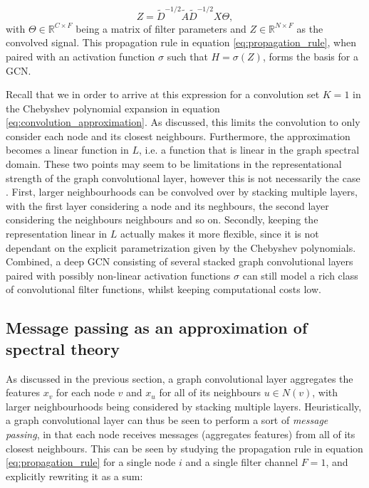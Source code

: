 \begin{equation}
    Z = \tilde{D}^{-1/2} \tilde{A} \tilde{D}^{-1/2} X \Theta,
    \label{eq:propagation_rule}
\end{equation}
with $\Theta \in \mathbb{R}^{C\times F}$ being a matrix of filter parameters and $Z \in \mathbb{R}^{N\times F}$ as the convolved signal. This propagation rule in equation \eqref{eq:propagation_rule}, when paired with an activation function $\sigma$ such that $H = \sigma\left(Z \right)$, forms the basis for a GCN. 

Recall that we in order to arrive at this expression for a convolution set $K=1$ in the Chebyshev polynomial expansion in equation \eqref{eq:convolution_approximation}. As discussed, this limits the convolution to only consider each node and its closest neighbours. Furthermore, the approximation becomes a linear function in $L$, i.e. a function that is linear in the graph spectral domain. These two points may seem to be limitations in the representational strength of the graph convolutional layer, however this is not necessarily the case \cite{kipf_semi_supervised}. First, larger neighbourhoods can be convolved over by stacking multiple layers, with the first layer considering a node and its neghbours, the second layer considering the neighbours neighbours and so on. Secondly, keeping the representation linear in $L$ actually makes it more flexible, since it is not dependant on the explicit parametrization given by the Chebyshev polynomials. Combined, a deep GCN consisting of several stacked graph convolutional layers paired with possibly non-linear activation functions $\sigma$ can still model a rich class of convolutional filter functions, whilst keeping computational costs low. 


\subsection{Message passing as an approximation of spectral theory}
\label{subsec:message_passing}

As discussed in the previous section, a graph convolutional layer aggregates the features $x_v$ for each node $v$ and $x_u$ for all of its neighbours $u \in N(v)$, with larger neighbourhoods being considered by stacking multiple layers. Heuristically, a graph convolutional layer can thus be seen to perform a sort of \textit{message passing}, in that each node receives messages (aggregates features) from all of its closest neighbours. This can be seen by studying the propagation rule in equation \eqref{eq:propagation_rule} for a single node $i$ and a single filter channel $F=1$, and explicitly rewriting it as a sum: 

